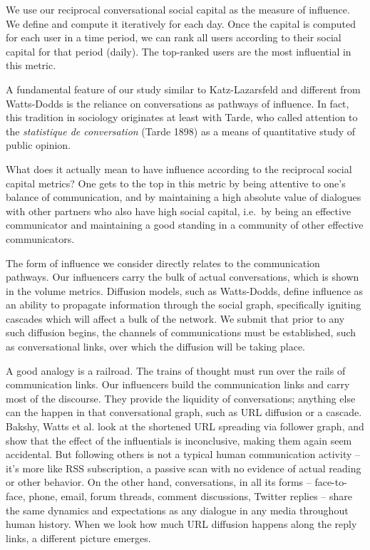 \documentclass[10pt,oneside]{memoir}
\begin{document}
We use our reciprocal conversational social capital as the measure of influence.  We define and compute it iteratively for each day.  Once the capital is computed for each user in a time period,  we can rank all users according to their social capital for that period (daily).  The top-ranked users are the most influential in this metric.


A fundamental feature of our study similar to Katz-Lazarsfeld and different from Watts-Dodds is the reliance on conversations as pathways of influence.  In fact, this tradition in sociology originates at least with Tarde, who called attention to  the \emph{statistique de conversation} (Tarde 1898) \cite{tarde1969communication} as a means of quantitative study of public opinion.


What does it actually mean to have influence according to the reciprocal social capital metrics?  One gets to the top in this metric by being attentive to one's balance of communication, and by maintaining a high absolute value of dialogues with other partners who also have high social capital, i.e.\ by being an effective communicator and maintaining a good standing in a community of other effective communicators.


The form of influence we consider directly relates to the communication pathways.  Our influencers carry the bulk of actual conversations, which is shown in the volume metrics.  Diffusion models, such as Watts-Dodds, define influence as an ability to propagate information through the social graph, specifically igniting cascades which will affect a bulk of the network.  We submit that prior to any such diffusion begins, the channels of communications must be established, such as conversational links, over which the diffusion will be taking place.


A good analogy is a railroad.  The trains of thought must run over the rails of communication links. Our influencers build the communication links and carry most of the discourse.  They provide the liquidity of conversations; anything else can the happen in that conversational graph, such as URL diffusion or a cascade.   Bakshy, Watts et al. \cite{bakshy2011everyone} look at the shortened URL spreading via follower graph, and show that the effect of the influentials is inconclusive, making them again seem accidental.  But following others is not a typical human communication activity -- it's more like RSS subscription, a passive scan with no evidence of actual reading or other behavior.  On the other hand, conversations, in all its forms -- face-to-face, phone, email, forum threads,  comment discussions, Twitter replies -- share the same dynamics and expectations as any dialogue in any media throughout human history.  When we look how much URL diffusion happens along the reply links, a different picture emerges.
\end{document}
